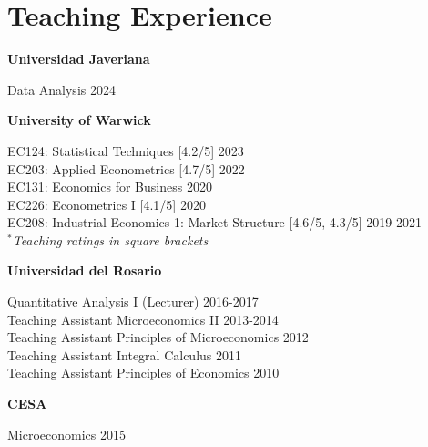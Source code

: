 \documentclass[10pt,letterpaper]{article}
\renewenvironment{itemize}{
	\begin{list}{}{
			\setlength{\leftmargin}{1.5em}
		}
	}{
	\end{list}
}
\begin{document}
	
	\section*{Teaching Experience}
	\begin{itemize}
		\item {\bf Universidad Javeriana}
		\begin{itemize}
			\item Data Analysis \hfill 2024 
		\end{itemize}
		
		\item {\bf University of Warwick}
		\begin{itemize}
			\item EC124: Statistical Techniques [4.2/5] \hfill 2023 \\
			EC203: Applied Econometrics [4.7/5] \hfill 2022\\
			EC131: Economics for Business \hfill 2020 \\
			EC226: Econometrics I [4.1/5] \hfill 2020 \\
			EC208: Industrial Economics 1: Market Structure [4.6/5, 4.3/5] \hfill 2019-2021 \\
			$^*$\emph{Teaching ratings in square brackets}
		\end{itemize}
		
		\item {\bf Universidad del Rosario}
		\begin{itemize}
			\item  Quantitative Analysis I (Lecturer) \hfill 2016-2017 \\
			Teaching Assistant Microeconomics II \hfill 2013-2014 \\
			Teaching Assistant Principles of Microeconomics \hfill 2012
			\\ Teaching Assistant Integral Calculus \hfill 2011
			\\ Teaching Assistant Principles of Economics \hfill 2010 
		\end{itemize}
		
		\clearpage
		
		\item {\bf CESA}
		\begin{itemize}
			\item  Microeconomics \hfill 2015
		\end{itemize}
	\end{itemize}
	
\end{document}
